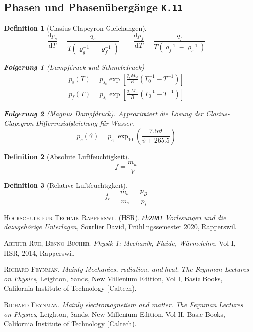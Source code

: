 \documentclass[a4paper, twocolumn]{article}
\numberwithin{equation}{section}
\theoremstyle{hsr-def}
\newtheorem{definition}{Definition}[section]
\theoremstyle{hsr-sub}
\newtheorem{result}{Folgerung}[definition]
\newcommand{\dd}[1]{\ensuremath{\mathrm{d}#1}}
\newcommand{\deriv}[2]{\ensuremath{\frac{\dd{#1}}{\dd{#2}}}}
\newcommand{\fromlecture}[1]{\textcolor{red!70!black}{\small\texttt{K.#1}}}
\begin{document}
\subsection{Phasen und Phasen\"uberg\"ange \fromlecture{11}}
\begin{definition}[Clasius-Clapeyron Gleichungen]
\[
    \deriv{p_s}{T} =
        \frac{q_s}{T\left(\varrho_g^{-1} - \varrho_f^{-1}\right)}
    \qquad
    \deriv{p_f}{T} =
        \frac{q_f}{T\left(\varrho_f^{-1} - \varrho_s^{-1}\right)}
\]
\begin{result}[Dampfdruck und Schmelzdruck]
\begin{gather*}
    p_s(T) = p_{s_0} \exp\left[
        \frac{q_s M_w}{R} \left(
            T_0^{-1} - T^{-1}
        \right)
    \right] \\
    p_f(T) = p_{s_0} \exp\left[
        \frac{q_f M_w}{R} \left(
            T_0^{-1} - T^{-1}
        \right)
    \right]
\end{gather*}
\end{result}

\begin{result}[Magnus Dampfdruck] Approximiert die L\"osung der Clasius-Clapeyron Differenzialgleichung f\"ur Wasser.
\[
    p_s(\vartheta) = p_{s_0}
        \exp_{10}\left({\frac{7.5\vartheta}{\vartheta + 265.5}}\right)
\]
\end{result}
\end{definition}

\begin{definition}[Absolute Luftfeuchtigkeit]
\[
    f = \frac{m_w}{V}
\]
\end{definition}

\begin{definition}[Relative Luftfeuchtigkeit]
\[
    f_r = \frac{m_w}{m_s} = \frac{p_D}{p_s}
\]
\end{definition}



\begin{thebibliography}{2}
	\textsc{Hochschule f\"ur Technik Rapperswil (HSR)}.
    \textit{\texttt{Ph2HAT} Vorlesungen und die dazugeh\"orige Unterlagen,}
	Sourlier David,
	Fr\"uhlingssemester 2020,
	Rapperswil.

	\textsc{Arthur Ruh, Benno Bucher}.
	\textit{Physik 1: Mechanik, Fluide, W\"armelehre}.
	Vol I, HSR, 2014, Rapperswil.

	\textsc{Richard Feynman}.
	\textit{Mainly Mechanics, radiation, and heat}.
	\textit{The Feynman Lectures on Physics},
	Leighton, Sands,
	New Millenium Edition,
	Vol I,
	Basic Books,
	California Institute of Technology (Caltech).

	\textsc{Richard Feynman}.
	\textit{Mainly electromagnetism and matter}.
	\textit{The Feynman Lectures on Physics},
	Leighton, Sands,
	New Millenium Edition,
	Vol II,
	Basic Books,
	California Institute of Technology (Caltech).
	
\end{thebibliography}
\end{document}

